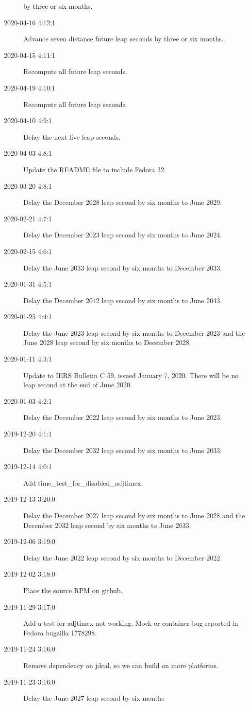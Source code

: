 \documentclass[letterpaper,twoside]{article}
\begin{document}
\begin{description}
  by three or six months.
\item[2020-04-16 4:12;1]Advance seven distance future leap seconds
  by three or six months.
\item[2020-04-15 4:11:1]Recompute all future leap seconds.
\item[2020-04-19 4:10:1]Recompute all future leap seconds.
\item[2020-04-10 4:9:1]Delay the next five leap seconds.
\item[2020-04-03 4:8:1]Update the README file to include Fedora 32.
\item[2020-03-20 4:8:1]Delay the December 2028 leap second by six months
  to June 2029.
\item[2020-02-21 4:7:1]Delay the December 2023 leap second by six months
  to June 2024.
\item[2020-02-15 4:6:1]Delay the June 2033 leap second by six months
  to December 2033.
\item[2020-01-31 4:5:1]Delay the December 2042 leap second by six months
  to June 2043.
\item[2020-01-25 4:4:1]Delay the June 2023 leap second by six months
  to December 2023 and the June 2028 leap second by six months to December 2028.
\item[2020-01-11 4:3:1]Update to IERS Bulletin C 59, issued January 7, 2020.
  There will be no leap second at the end of June 2020.
\item[2020-01-03 4:2:1]Delay the December 2022 leap second by six months
  to June 2023.
\item[2019-12-20 4:1:1]Delay the December 2032 leap second by six months
  to June 2033.
\item[2019-12-14 4:0:1]Add {\ttfamily time\_test\_for\_disabled\_adjtimex}.
\item[2019-12-13 3:20:0]Delay the December 2027 leap second by six months
  to June 2028 and the December 2032 leap second by six months to June 2033.
\item[2019-12-06 3:19:0]Delay the June 2022 leap second by six months
  to December 2022.
\item[2019-12-02 3:18:0]Place the source RPM on github.
\item[2019-11-29 3:17:0]Add a test for adjtimex not working.
  Mock or container bug reported in Fedora bugzilla 1778298.
\item[2019-11-24 3:16:0]Remove dependency on jdcal, so we can build
  on more platforms.
\item[2019-11-23 3:16:0]Delay the June 2027 leap second by six months

\end{description}
\end{document}
